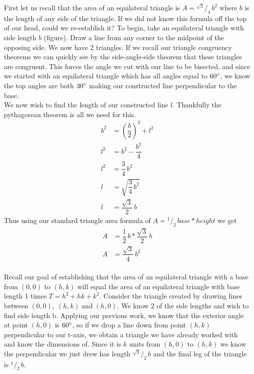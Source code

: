 \documentclass[12pt,letter]{article}
\newcommand*\rfrac[2]{{}^{#1}\!/_{#2}}
\begin{document}
First let us recall that the area of an equilateral triangle is $A = \rfrac {\sqrt{3}} {4} \, b^2$ where $b$ is the length of any side of the triangle. If we did not know this formula off the top of our head, could we re-establish it? To begin, take an equilateral triangle with side length $b$ (figure). Draw a line from any corner to the midpoint of the opposing side. We now have 2 triangles. If we recall our triangle congruency theorems we can quickly see by the side-angle-side theorem that these triangles are congruent. This forces the angle we cut with our line to be bisected, and since we started with an equilateral triangle which has all angles equal to $60\degree$, we know the top angles are both $30\degree$ making our constructed line perpendicular to the base. \\

We now wish to find the length of our constructed line $l$. Thankfully the pythagorean theorem is all we need for this.
\begin{align*}
b^2 &= \left(\dfrac{b} {2}\right)^2 + l^2 \\
l^2 &= b^2 - \dfrac{b^2} {4} \\
l^2 &= \dfrac{3} {4} \, b^2 \\
l &= \sqrt{\dfrac{3} {4} \, b^2} \\
l &= \dfrac{\sqrt{3}} {2} \, b
\end{align*}
Thus using our standard triangle area formula of $A = \rfrac{1} {2} \, base * height$ we get
\begin{align*}
A &= \dfrac{1} {2} \, b * \dfrac{\sqrt{3}} {2} \, b \\
A &= \dfrac{\sqrt{3}} {4} \, b^2
\end{align*} \\

Recall our goal of establishing that the area of an equilateral triangle with a base from $(0,0)$ to $(h,k)$ will equal the area of an equilateral triangle with base length 1 times $T = h^2 + hk + k^2$. Consider the triangle created by drawing lines between $(0,0), \; (h,k) \; \text{and} \; (h,0)$. We know 2 of the side lengths and wish to find side length b. Applying our previous work, we know that the exterior angle at point $(h,0)$ is $60\degree$, so if we drop a line down from point $(h,k)$ perpendicular to our t-axis, we obtain a triangle we have already worked with and know the dimensions of. Since it is $k$ units from $(h,0)$ to $(h,k)$ we know the perpendicular we just drew has length $\rfrac{\sqrt{3}} {2} \, b$ and the final leg of the triangle is $\rfrac 1 2 \, b$.
\end{document}
